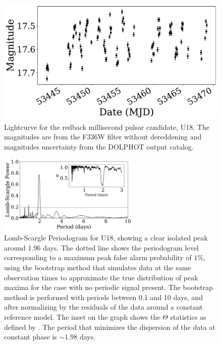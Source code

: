 \documentclass[fleqn,usenatbib,useAMS,letters]{mnras}
\begin{document}
\begin{figure}
	\includegraphics[width=\columnwidth]{lcurvemjd-eps-converted-to.pdf}
    \caption{Lightcurve for the redback millisecond pulsar candidate, U18. The magnitudes are from the F336W filter without dereddening and magnitudes uncertainty from the DOLPHOT output catalog.}
    \label{fig:lc}
\end{figure}


 \begin{figure}
	\includegraphics[width=0.6\textwidth]{LandPDM-eps-converted-to.pdf}
    \caption{Lomb-Scargle Periodogram for %
    U18, showing a clear isolated peak around 1.96 days. The dotted line shows the periodogram level corresponding to a maximum peak false alarm probability of $1\%$, using the bootstrap method that simulates data at the same observation times to approximate the true distribution of peak maxima for the case with no periodic signal present. The bootstrap method is performed with periods between 0.1 and 10 days, and after normalizing by the residuals of the data around a constant reference model. The inset on the graph shows the $\Theta$ statistics as defined by \protect\cite{PDMStellingwerf78}. The period that minimizes the dispersion of the data at constant phase is $\sim 1.98$ days. }
    \label{fig:periodogram}
\end{figure}
\end{document}
